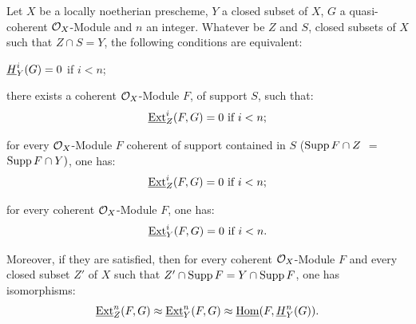 \begin{proposition} \label{VII.1.2}
Let $X$ be a locally noetherian prescheme, $Y$ a closed subset of $X$, $G$ a quasi-coherent $\mathcal{O}_X$-Module and $n$ an integer. Whatever be $Z$ and $S$, closed subsets of $X$ such that $Z \cap S = Y$, the following conditions are equivalent:
\begin{enumeratei}
\item
$\underline{H}^i_Y (G) = 0$ if $i<n$;

\item
there exists a coherent $\mathcal{O}_X$-Module $F$, of support $S$, such that:
\[
\operatorname{\underline{Ext}}^i_Z (F, G) = 0 \text{ if } i<n;\]

\item
for every $\mathcal{O}_X$-Module $F$ coherent of support contained in $S$ (\ie $\operatorname{Supp} F \cap Z$ $=$ $\operatorname{Supp} F \cap Y)$, one has:
\[
\operatorname{\underline{Ext}}^i_{Z}(F, G) = 0 \text{ if } i < n;
\]
\item
for every coherent $\mathcal{O}_X$-Module $F$, one has:
\[
\operatorname{\underline{Ext}}^i_Y (F, G) = 0 \text{ if } i < n.
\]
\end{enumeratei}
\noindent
Moreover, if they are satisfied, then for every coherent $\mathcal{O}_X$-Module $F$ and every closed subset $Z'$ of $X$ such that $Z' \cap \operatorname{Supp} F = Y \cap \operatorname{Supp} F$, one has isomorphisms:
\[
\operatorname{\underline{Ext}}^n_{Z} (F, G) \approx \operatorname{\underline{Ext}}^n_Y (F, G) \approx \operatorname{\underline{Hom}} (F, \underline{H}^n_Y (G)).
\]
\end{proposition}

